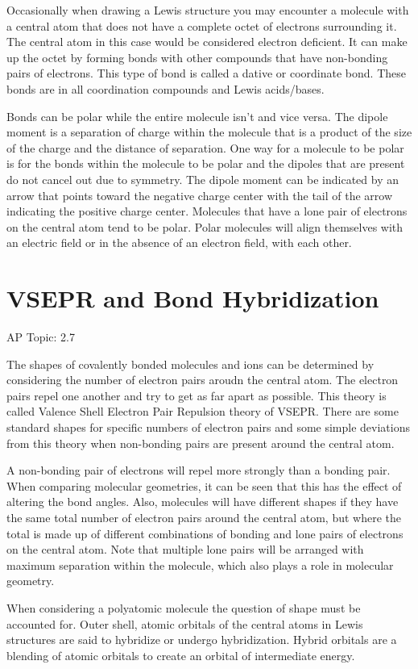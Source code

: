 \documentclass[../chem.tex]{subfiles}
\begin{document}
Occasionally when drawing a Lewis structure you may encounter a molecule with a central atom that does not have a complete octet of electrons surrounding it.
The central atom in this case would be considered electron deficient. It can make up the octet by forming bonds with other compounds that have non-bonding pairs of electrons.
This type of bond is called a dative or coordinate bond. These bonds are in all coordination compounds and Lewis acids/bases.

Bonds can be polar while the entire molecule isn't and vice versa. The dipole moment is a separation of charge within the molecule that is a 
product of the size of the charge and the distance of separation. One way for a molecule to be polar is for the bonds within the molecule to be polar and the 
dipoles that are present do not cancel out due to symmetry. The dipole moment can be indicated by an arrow that points toward the negative 
charge center with the tail of the arrow indicating the positive charge center. Molecules that have a lone pair of electrons on the central atom tend to be polar. 
Polar molecules will align themselves with an electric field or in the absence of an electron field, with each other.
\section{VSEPR and Bond Hybridization}
AP Topic: 2.7

The shapes of covalently bonded molecules and ions can be determined by considering the number of electron pairs aroudn the central atom. 
The electron pairs repel one another and try to get as far apart as possible. This theory is called Valence Shell Electron Pair Repulsion theory of VSEPR.
There are some standard shapes for specific numbers of electron pairs and some simple deviations from this theory when non-bonding pairs 
are present around the central atom.

A non-bonding pair of electrons will repel more strongly than a bonding pair. When comparing molecular geometries, it can be seen that this has the effect of 
altering the bond angles. Also, molecules will have different shapes if they have the same total number of electron pairs around the central atom, 
but where the total is made up of different combinations of bonding and lone pairs of electrons on the central atom. Note that multiple lone pairs 
will be arranged with maximum separation within the molecule, which also plays a role in molecular geometry.

When considering a polyatomic molecule the question of shape must be accounted for. Outer shell, atomic orbitals of the central atoms in 
Lewis structures are said to hybridize or undergo hybridization. Hybrid orbitals are a blending of atomic orbitals to create an orbital of intermediate energy. 
\end{document}
